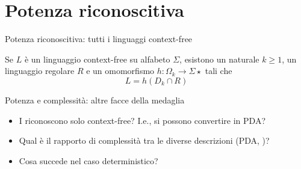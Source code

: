 \documentclass{beamer}
\begin{document}
\section{Potenza riconoscitiva}
\begin{frame}{Potenza riconoscitiva: tutti i linguaggi context-free}
	\begin{theor}
		Se $L$ è un linguaggio context-free su alfabeto $\Sigma$, esistono un naturale $k\ge1$, un linguaggio regolare $R$ e un omomorfismo $h:\Omega_k\to\Sigma\star$ tali che
		\begin{equation*}
			L=h(D_k\cap R)
		\end{equation*}
	\end{theor}
\end{frame}

\begin{frame}{Potenza e complessità: altre facce della medaglia}
	\begin{itemize}
		\item I  riconoscono solo context-free? I.e., si possono convertire in PDA?
		\item Qual è il rapporto di complessità tra le diverse descrizioni (PDA, )?
		\item Cosa succede nel caso deterministico?
	\end{itemize}
\end{frame}
\end{document}

